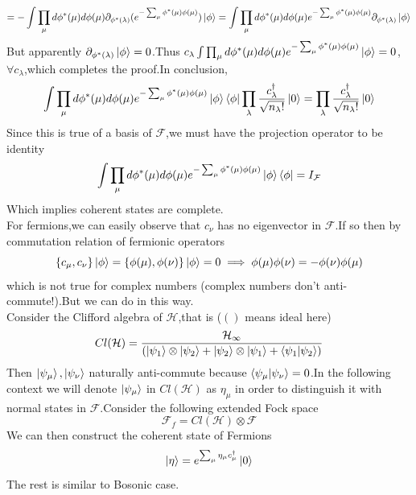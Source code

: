 \documentclass[a4paper,12pt]{article}
\theoremstyle{mystyle}
\theoremstyle{mystyle}
\numberwithin{equation}{section}
\begin{document}
	$$=-\int \prod_{\mu}d\phi^*(\mu)d\phi(\mu)\partial_{\phi^*(\lambda)}(e^{-\sum_\mu \phi^*(\mu)\phi(\mu)})\ket{\phi}=\int \prod_{\mu}d\phi^*(\mu)d\phi(\mu)e^{-\sum_\mu \phi^*(\mu)\phi(\mu)}\partial_{\phi^*(\lambda)}\ket{\phi}$$
	But apparently $\partial_{\phi^*(\lambda)}\ket{\phi}=0$.Thus $c_\lambda \int \prod_{\mu}d\phi^*(\mu)d\phi(\mu)e^{-\sum_\mu \phi^*(\mu)\phi(\mu)}\ket{\phi}=0$,$\forall c_\lambda$,which completes the proof.In conclusion,
	$$\int \prod_\mu d\phi^*(\mu)d\phi(\mu)e^{-\sum_\mu \phi^*(\mu)\phi(\mu)}\ket{\phi}\bra{\phi}\prod_\lambda \frac{c_\lambda^\dagger}{\sqrt{n_\lambda!}}\ket{0}=\prod_\lambda \frac{c_\lambda^\dagger}{\sqrt{n_\lambda!}}\ket{0}$$
	Since this is true of a basis of $\mathcal{F}$,we must have the projection operator to be identity
	$$\int \prod_\mu d\phi^*(\mu)d\phi(\mu)e^{-\sum_\mu \phi^*(\mu)\phi(\mu)}\ket{\phi}\bra{\phi}=I_{\mathcal{F}}$$
	Which implies coherent states are complete.
	\\
	For fermions,we can easily observe that $c_\nu$ has no eigenvector in $\mathcal{F}$.If so then by commutation relation of fermionic operators
	$$\{c_\mu,c_\nu\}\ket{\phi}=\{\phi(\mu),\phi(\nu)\}\ket{\phi}=0\implies \phi(\mu)\phi(\nu)=-\phi(\nu)\phi(\mu)$$
	which is not true for complex numbers (complex numbers don't anti-commute!).But we can do in this way.
	\\
	Consider the Clifford algebra of $\mathcal{H}$,that is ($()$ means ideal here)
	$$Cl(\mathcal{H})=\frac{\mathcal{H}_\infty}{(\ket{\psi_1}\otimes \ket{\psi_2}+\ket{\psi_2}\otimes \ket{\psi_1}+\braket{\psi_1|\psi_2})}$$
	Then $\ket{\psi_\mu},\ket{\psi_\nu}$ naturally anti-commute because $\braket{\psi_\mu|\psi_\nu}=0$.In the following context we will denote $\ket{\psi_\mu}$ in $Cl(\mathcal{H})$ as $\eta_\mu$ in order to distinguish it with normal states in $\mathcal{F}$.Consider the following extended Fock space
	$$\mathcal{F}_f=Cl(\mathcal{H})\otimes \mathcal{F}$$
	We can then construct the coherent state of Fermions
	$$\ket{\eta}=e^{\sum_{\mu}\eta_\mu c_\mu^\dagger}\ket{0}$$
	The rest is similar to Bosonic case.
\end{document}
